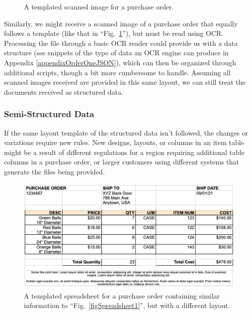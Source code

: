 \documentclass[conference]{IEEEtran}
\begin{document}
\begin{figure}[ht]
\centerline{
}
\caption{A templated scanned image for a purchase order.}
\label{figScanned1}
\end{figure}

Similarly, we might receive a scanned image of a purchase order that equally follows a template (like that in ``Fig.~\ref{figScanned1}''), but must be read using OCR. Processing the file through a basic OCR reader could provide us with a data structure (see snippets of the type of data an OCR engine can produce in Appendix \ref{appendixOrderOneJSON}), which can then be organized through additional scripts, though a bit more cumbersome to handle. Assuming all scanned images received are provided in this same layout, we can still treat the documents received as structured data.

\subsubsection{Semi-Structured Data}
If the same layout template of the structured data isn't followed, the changes or variations require new rules. New designs, layouts, or columns in an item table might be a result of different regulations for a region requiring additional table columns in a purchase order, or larger customers using different systems that generate the files being provided.

\begin{figure}[ht]
\centerline{\includegraphics[width=\columnwidth]{Spreadsheet2.png}}
\caption{A templated spreadsheet for a purchase order containing similar information to ``Fig.~\ref{figSpreadsheet1}'', but with a different layout.}
\label{figSpreadsheet2}
\end{figure}
\end{document}
